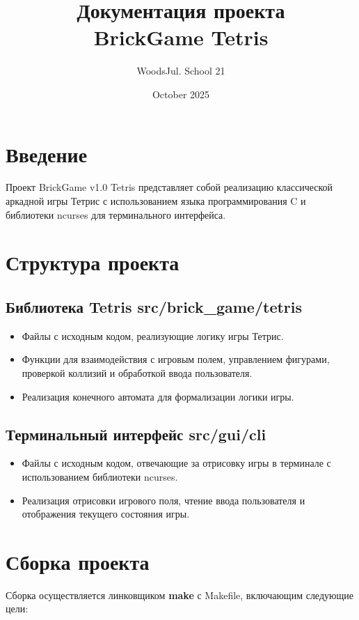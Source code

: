 \documentclass[12pt, letterpaper, twoside]{article}
\title{Документация проекта\\BrickGame Tetris}
\author{WoodsJul. School 21}
\date{October 2025}
\begin{document}
\maketitle
\section{Введение}
Проект BrickGame v1.0 Tetris представляет собой реализацию классической аркадной игры Тетрис с использованием языка программирования C и библиотеки ncurses для терминального интерфейса.

\section{Структура проекта}

\subsection{Библиотека Tetris {src/brick\_game/tetris}}

\begin{itemize}
    \item Файлы с исходным кодом, реализующие логику игры Тетрис.
    \item Функции для взаимодействия с игровым полем, управлением фигурами, проверкой коллизий и обработкой ввода пользователя.
    \item Реализация конечного автомата для формализации логики игры.
\end{itemize}

\subsection{Терминальный интерфейс {src/gui/cli}}

\begin{itemize}
    \item Файлы с исходным кодом, отвечающие за отрисовку игры в терминале с использованием библиотеки ncurses.
    \item Реализация отрисовки игрового поля, чтение ввода пользователя и отображения текущего состояния игры.
\end{itemize}

\section{Сборка проекта}

Сборка осуществляется линковщиком {\textbf{make}} с Makefile, включающим следующие цели:
\end{document}
